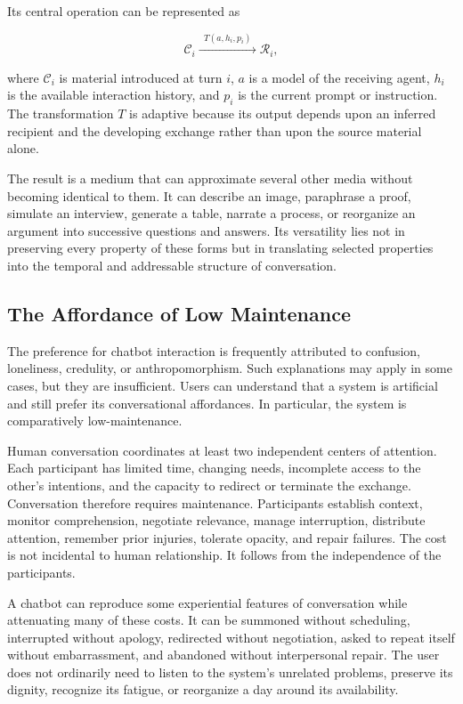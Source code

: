 \documentclass[11pt]{article}
\newcommand{\contentobj}{\mathcal{C}}
\newcommand{\receivedobj}{\mathcal{R}}
\begin{document}
Its central operation can be represented as

\begin{equation}
  \contentobj_i
  \xrightarrow{\;\;T(a,h_i,p_i)\;\;}
  \receivedobj_i,
  \label{eq:adaptive-conversion}
\end{equation}

where \(\contentobj_i\) is material introduced at turn \(i\), \(a\) is a model
of the receiving agent, \(h_i\) is the available interaction history, and
\(p_i\) is the current prompt or instruction. The transformation \(T\) is
adaptive because its output depends upon an inferred recipient and the
developing exchange rather than upon the source material alone.

The result is a medium that can approximate several other media without
becoming identical to them. It can describe an image, paraphrase a proof,
simulate an interview, generate a table, narrate a process, or reorganize an
argument into successive questions and answers. Its versatility lies not in
preserving every property of these forms but in translating selected
properties into the temporal and addressable structure of conversation.

\subsection{The Affordance of Low Maintenance}

The preference for chatbot interaction is frequently attributed to confusion,
loneliness, credulity, or anthropomorphism. Such explanations may apply in
some cases, but they are insufficient. Users can understand that a system is
artificial and still prefer its conversational affordances. In particular,
the system is comparatively low-maintenance.

Human conversation coordinates at least two independent centers of attention.
Each participant has limited time, changing needs, incomplete access to the
other's intentions, and the capacity to redirect or terminate the exchange.
Conversation therefore requires maintenance. Participants establish context,
monitor comprehension, negotiate relevance, manage interruption, distribute
attention, remember prior injuries, tolerate opacity, and repair failures.
The cost is not incidental to human relationship. It follows from the
independence of the participants.

A chatbot can reproduce some experiential features of conversation while
attenuating many of these costs. It can be summoned without scheduling,
interrupted without apology, redirected without negotiation, asked to repeat
itself without embarrassment, and abandoned without interpersonal repair.
The user does not ordinarily need to listen to the system's unrelated
problems, preserve its dignity, recognize its fatigue, or reorganize a day
around its availability.
\end{document}
